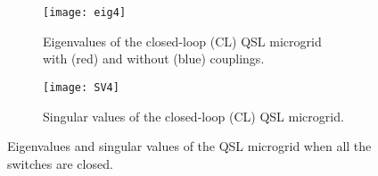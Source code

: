 \documentclass[a4paper]{article}
\theoremstyle{plain}
\begin{document}
 \begin{figure}[!htb]
                      \centering
		     \begin{subfigure}[!htb]{0.48\textwidth}
                        \centering
                        \texttt{[image: eig4]}
                        \caption{Eigenvalues of the closed-loop (CL) QSL microgrid with (red) and without (blue) couplings.}
                        \label{fig:Matlab4a}
                      \end{subfigure}
                      \begin{subfigure}[!htb]{0.48\textwidth}
                        \centering
                        \texttt{[image: SV4]}
                        \caption{Singular values of the closed-loop (CL) QSL microgrid.}
                        \label{fig:Matla4b}
                      \end{subfigure}
		\caption{Eigenvalues and singular values of the QSL microgrid when all the switches are closed.}
		\label{Fig6:Matlab4}

                    \end{figure}

	
\end{document}
